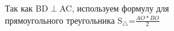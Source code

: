 \documentclass[preview]{standalone}
\begin{document}
\begin{center}
Так как BD$\perp$AC, используем формулу для \\ прямоугольного треугольника S$_\triangle$=$\frac{AO * BO}{2}$
\end{center}
\end{document}
